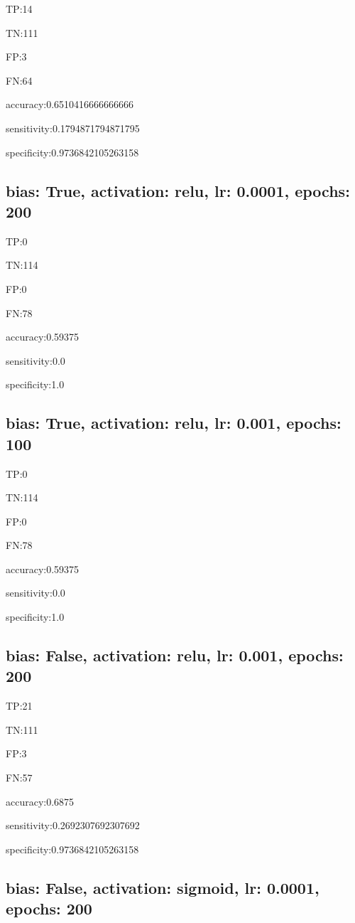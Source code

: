\documentclass{article}
\begin{document}
TP:14

TN:111

FP:3

FN:64

accuracy:0.6510416666666666

sensitivity:0.1794871794871795

specificity:0.9736842105263158



\subsection{bias: True, activation: relu, lr: 0.0001, epochs: 200}

TP:0

TN:114

FP:0

FN:78

accuracy:0.59375

sensitivity:0.0

specificity:1.0



\subsection{bias: True, activation: relu, lr: 0.001, epochs: 100}

TP:0

TN:114

FP:0

FN:78

accuracy:0.59375

sensitivity:0.0

specificity:1.0



\subsection{bias: False, activation: relu, lr: 0.001, epochs: 200}

TP:21

TN:111

FP:3

FN:57

accuracy:0.6875

sensitivity:0.2692307692307692

specificity:0.9736842105263158



\subsection{bias: False, activation: sigmoid, lr: 0.0001, epochs: 200}
\end{document}
